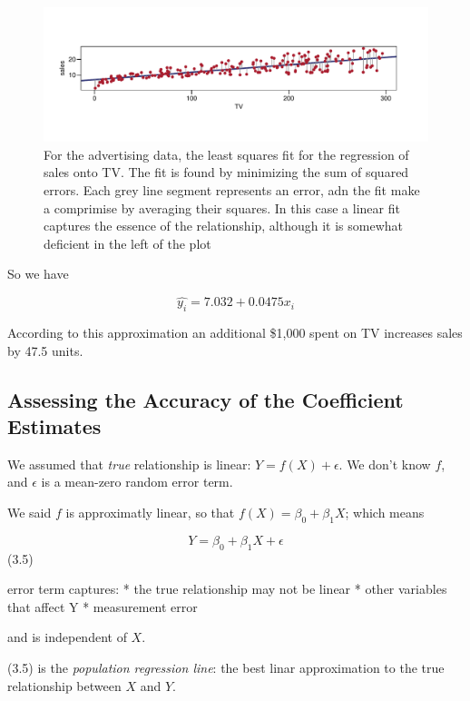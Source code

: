 \documentclass[
  letterpaper,
  DIV=11,
  numbers=noendperiod]{scrreprt}
\begin{document}
\begin{figure}[H]

{\centering \includegraphics{Chapter3_files/figure-pdf/unnamed-chunk-8-1.pdf}

}

\caption{For the advertising data, the least squares fit for the
regression of sales onto TV. The fit is found by minimizing the sum of
squared errors. Each grey line segment represents an error, adn the fit
make a comprimise by averaging their squares. In this case a linear fit
captures the essence of the relationship, although it is somewhat
deficient in the left of the plot}

\end{figure}

So we have

\[
\hat{y_i} = 7.032 + 0.0475x_i
\]

According to this approximation an additional \$1,000 spent on TV
increases sales by 47.5 units.

\hypertarget{assessing-the-accuracy-of-the-coefficient-estimates}{%
\subsection{Assessing the Accuracy of the Coefficient
Estimates}\label{assessing-the-accuracy-of-the-coefficient-estimates}}

We assumed that \emph{true} relationship is linear:
\(Y = f(X) + \epsilon\). We don't know \(f\), and \(\epsilon\) is a
mean-zero random error term.

We said \(f\) is approximatly linear, so that
\(f(X) = \beta_0 + \beta_1 X\); which means

\[
Y = \beta_0 + \beta_1 X + \epsilon
\] (3.5)

error term captures: * the true relationship may not be linear * other
variables that affect Y * measurement error

and is independent of \(X\).

(3.5) is the \emph{population regression line}: the best linar
approximation to the true relationship between \(X\) and \(Y\).
\end{document}
